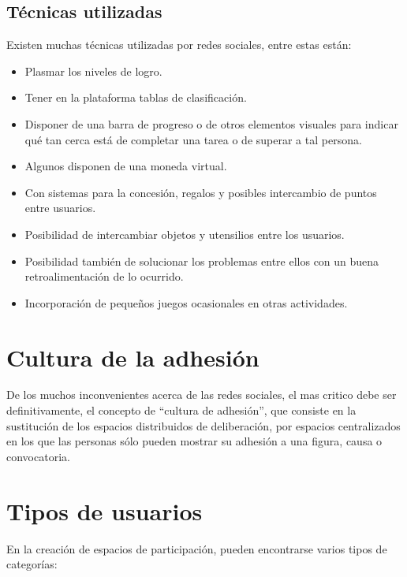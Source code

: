 \subsection{Técnicas utilizadas}

Existen muchas técnicas utilizadas por redes sociales, entre estas están:

\begin{itemize}
\item Plasmar los niveles de logro.
\item Tener en la plataforma tablas de clasificación.
\item Disponer de una barra de progreso o de otros elementos visuales para
      indicar qué tan cerca está de completar una tarea o de superar a tal
      persona.
\item Algunos disponen de una moneda virtual.
\item Con sistemas para la concesión, regalos y posibles intercambio de puntos
      entre usuarios.
\item Posibilidad de intercambiar objetos y utensilios entre los usuarios.
\item Posibilidad también de solucionar los problemas entre ellos con un buena
      retroalimentación de lo ocurrido.
\item Incorporación de pequeños juegos ocasionales en otras actividades.
\end{itemize}

\section{Cultura de la adhesión}

De los muchos inconvenientes acerca de las redes sociales, el mas critico debe
ser definitivamente, el concepto de “cultura de adhesión”, que consiste en la
sustitución de los espacios distribuidos de deliberación, por espacios
centralizados en los que las personas sólo pueden mostrar su adhesión a una
figura, causa o convocatoria\cite{LasIndias}.

\section{Tipos de usuarios}

En la creación de espacios de participación, pueden encontrarse varios tipos de
categorías\cite{Santamaria2}:

